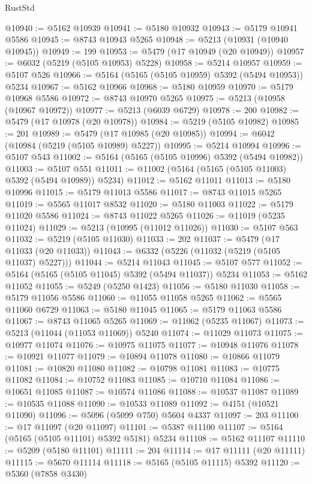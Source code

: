 \begin{lexlean}{RustStd}
\begin{coremodule}
@10940 := @5162 @10939
@10941 := @5180 @10932
@10943 := @5179 @10941 @5586
@10945 := @8743 @10943 @5265
@10948 := @5213 (@10931 (@10940 @10945))
@10949 := 199
@10953 := @5479 (@17 @10949 (@20 @10949))
@10957 := @6032 (@5219 (@5105 @10953) @5228)
@10958 := @5214 @10957
@10959 := @5107 @526
@10966 := @5164 (@5165 (@5105 @10959) @5392 (@5494 @10953)) @5234
@10967 := @5162 @10966
@10968 := @5180 @10959
@10970 := @5179 @10968 @5586
@10972 := @8743 @10970 @5265
@10975 := @5213 (@10958 (@10967 @10972))
@10977 := @5213 (@6039 @6729)
@10978 := 200
@10982 := @5479 (@17 @10978 (@20 @10978))
@10984 := @5219 (@5105 @10982)
@10985 := 201
@10989 := @5479 (@17 @10985 (@20 @10985))
@10994 := @6042 (@10984 (@5219 (@5105 @10989) @5227))
@10995 := @5214 @10994
@10996 := @5107 @543
@11002 := @5164 (@5165 (@5105 @10996) @5392 (@5494 @10982))
@11003 := @5107 @551
@11011 := @11002 (@5164 (@5165 (@5105 @11003) @5392 (@5494 @10989)) @5234)
@11012 := @5162 @11011
@11013 := @5180 @10996
@11015 := @5179 @11013 @5586
@11017 := @8743 @11015 @5265
@11019 := @5565 @11017 @8532
@11020 := @5180 @11003
@11022 := @5179 @11020 @5586
@11024 := @8743 @11022 @5265
@11026 := @11019 (@5235 @11024)
@11029 := @5213 (@10995 (@11012 @11026))
@11030 := @5107 @563
@11032 := @5219 (@5105 @11030)
@11033 := 202
@11037 := @5479 (@17 @11033 (@20 @11033))
@11043 := @6332 (@5226 (@11032 (@5219 (@5105 @11037) @5227)))
@11044 := @5214 @11043
@11045 := @5107 @577
@11052 := @5164 (@5165 (@5105 @11045) @5392 (@5494 @11037)) @5234
@11053 := @5162 @11052
@11055 := @5249 (@5250 @1423)
@11056 := @5180 @11030
@11058 := @5179 @11056 @5586
@11060 := @11055 @11058 @5265
@11062 := @5565 @11060 @6729
@11063 := @5180 @11045
@11065 := @5179 @11063 @5586
@11067 := @8743 @11065 @5265
@11069 := @11062 (@5235 @11067)
@11073 := @5213 (@11044 (@11053 @11069)) @5240
@11074 := @11029 @11073
@11075 := @10977 @11074
@11076 := @10975 @11075
@11077 := @10948 @11076
@11078 := @10921 @11077
@11079 := @10894 @11078
@11080 := @10866 @11079
@11081 := @10820 @11080
@11082 := @10798 @11081
@11083 := @10775 @11082
@11084 := @10752 @11083
@11085 := @10710 @11084
@11086 := @10651 @11085
@11087 := @10574 @11086
@11088 := @10537 @11087
@11089 := @10535 @11088
@11090 := @10533 @11089
@11092 := @4151 (@10521 @11090)
@11096 := @5096 (@5099 @750) @5604 @4337
@11097 := 203
@11100 := @17 @11097 (@20 @11097)
@11101 := @5387 @11100
@11107 := @5164 (@5165 (@5105 @11101) @5392 @5181) @5234
@11108 := @5162 @11107
@11110 := @5209 (@5180 @11101)
@11111 := 204
@11114 := @17 @11111 (@20 @11111)
@11115 := @5670 @11114
@11118 := @5165 (@5105 @11115) @5392
@11120 := @5360 (@7858 @3430)

\end{coremodule}
\end{lexlean}
